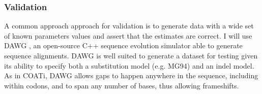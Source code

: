 



\subsubsection{Validation}

A common approach approach for validation is to generate data with a wide set
of known parameters values and assert that the estimates are correct.
I will use DAWG \parencite{cartwright2005dawg}, an open-source C++ sequence
evolution simulator able to generate sequence alignments.
DAWG is well suited to generate a dataset for testing given its ability to
specify both a substitution model (e.g. MG94) and an indel model.
As in COATi, DAWG allows gaps to happen anywhere in the sequence, including
within codons, and to span any number of bases, thus allowing frameshifts.



